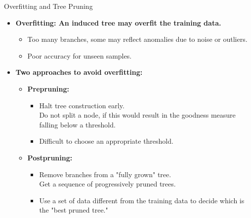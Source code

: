 \begin{frame}{Overfitting and Tree Pruning}
	\begin{itemize}
		\item \textbf{Overfitting: An induced tree may overfit the training data.}
		      \begin{itemize}
			      \item Too many branches, some may reflect anomalies due to noise or outliers.
			      \item Poor accuracy for unseen samples.
		      \end{itemize}
		\item \textbf{Two approaches to avoid overfitting:}
		      \begin{itemize}
			      \item \textbf{\color{airforceblue}Prepruning:}
			            \begin{itemize}
				            \item Halt tree construction early.\\
				                  Do not split a node, if this would result in the goodness measure falling below a threshold.
				            \item Difficult to choose an appropriate threshold.
			            \end{itemize}
			      \item \textbf{\color{airforceblue}Postpruning:}
			            \begin{itemize}
				            \item Remove branches from a "fully grown" tree.\\
				                  Get a sequence of progressively pruned trees.
				            \item Use a set of data different from the training data to decide which is the "best pruned tree."
			            \end{itemize}
		      \end{itemize}
	\end{itemize}
\end{frame}

